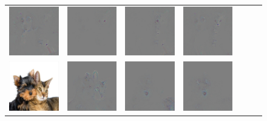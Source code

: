 \begin{figure}
\begin{center}
\begin{tabular}{ccccccc}
\includegraphics[width=0.14\linewidth,height=0.115\linewidth]{figs/class_compare/googlenet/soft/dog-cat2_diff_188} &
\includegraphics[width=0.14\linewidth,height=0.115\linewidth]{figs/class_compare/googlenet/soft/dog-cat2_diff_279} &
\includegraphics[width=0.14\linewidth,height=0.115\linewidth]{figs/class_compare/googlenet/soft/dog-cat2_diff_293} &
\includegraphics[width=0.14\linewidth,height=0.115\linewidth]{figs/class_compare/googlenet/soft/dog-cat2_diff_10} \\
\includegraphics[width=0.14\linewidth,height=0.115\linewidth]{figs/class_compare/googlenet/soft/dog-cat3} &
\includegraphics[width=0.14\linewidth,height=0.115\linewidth]{figs/class_compare/googlenet/soft/dog-cat3_diff_258} &
\includegraphics[width=0.14\linewidth,height=0.115\linewidth]{figs/class_compare/googlenet/soft/dog-cat3_diff_163} &
\includegraphics[width=0.14\linewidth,height=0.115\linewidth]{figs/class_compare/googlenet/soft/dog-cat3_diff_188} &

\end{tabular}
\end{center}
\end{figure}
